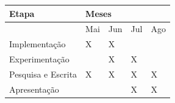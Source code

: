 \documentclass[prop-esp]{iiufrgs}
\begin{document}
\begin{table}[H]
    \centering
    \begin{tabular}{|p{1.8in}|p{0.5in}|p{0.5in}|p{0.5in}|p{0.5in}|} \hline 
Etapa & \multicolumn{4}{|p{2.0in}|}{Meses} \\ \hline 
 & Mai & Jun & Jul & Ago  \\ \hline 
Implementação & X & X &  &   \\ \hline 
Experimentação &  & X & X &   \\ \hline 
Pesquisa e Escrita & X & X & X & X  \\ \hline 
Apresentação &  &  & X & X  \\ \hline 
\end{tabular}
    \label{tab:cronog}
\end{table}



%


\end{document}
